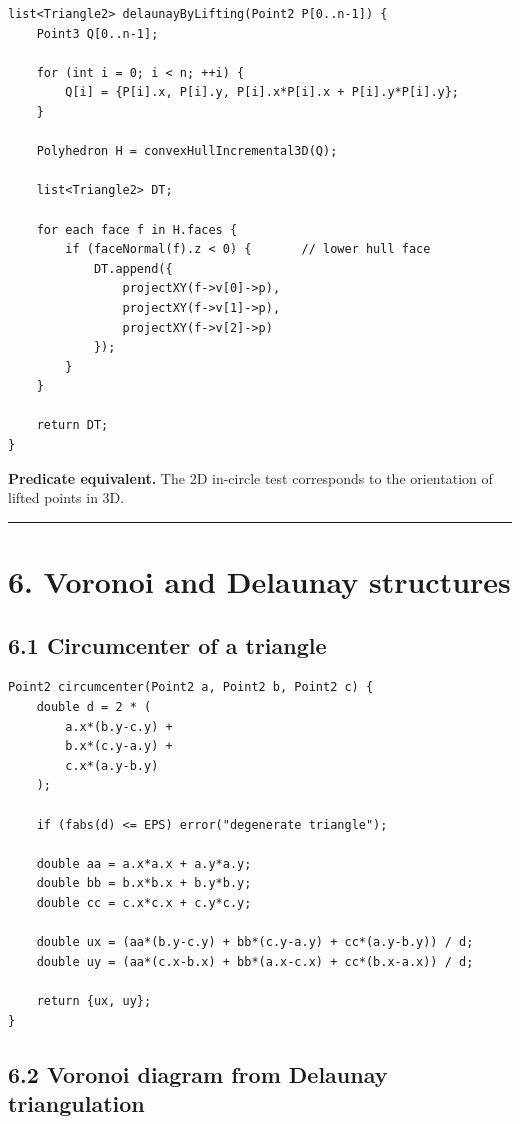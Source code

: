 \documentclass[11pt]{article}
\begin{document}
\begin{verbatim}
list<Triangle2> delaunayByLifting(Point2 P[0..n-1]) {
    Point3 Q[0..n-1];

    for (int i = 0; i < n; ++i) {
        Q[i] = {P[i].x, P[i].y, P[i].x*P[i].x + P[i].y*P[i].y};
    }

    Polyhedron H = convexHullIncremental3D(Q);

    list<Triangle2> DT;

    for each face f in H.faces {
        if (faceNormal(f).z < 0) {       // lower hull face
            DT.append({
                projectXY(f->v[0]->p),
                projectXY(f->v[1]->p),
                projectXY(f->v[2]->p)
            });
        }
    }

    return DT;
}
\end{verbatim}

\textbf{Predicate equivalent.} The 2D in-circle test corresponds to the
orientation of lifted points in 3D.

\begin{center}\rule{0.5\linewidth}{0.5pt}\end{center}

\section{6. Voronoi and Delaunay
structures}\label{voronoi-and-delaunay-structures}

\subsection{6.1 Circumcenter of a
triangle}\label{circumcenter-of-a-triangle}

\begin{verbatim}
Point2 circumcenter(Point2 a, Point2 b, Point2 c) {
    double d = 2 * (
        a.x*(b.y-c.y) +
        b.x*(c.y-a.y) +
        c.x*(a.y-b.y)
    );

    if (fabs(d) <= EPS) error("degenerate triangle");

    double aa = a.x*a.x + a.y*a.y;
    double bb = b.x*b.x + b.y*b.y;
    double cc = c.x*c.x + c.y*c.y;

    double ux = (aa*(b.y-c.y) + bb*(c.y-a.y) + cc*(a.y-b.y)) / d;
    double uy = (aa*(c.x-b.x) + bb*(a.x-c.x) + cc*(b.x-a.x)) / d;

    return {ux, uy};
}
\end{verbatim}

\subsection{6.2 Voronoi diagram from Delaunay
triangulation}\label{voronoi-diagram-from-delaunay-triangulation}
\end{document}
